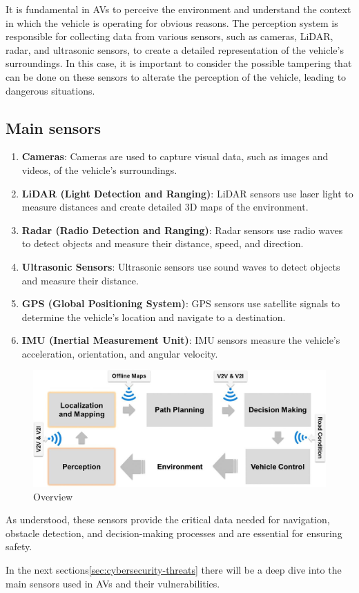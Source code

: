 It is fundamental in AVs to perceive the environment and understand the context in which the vehicle is operating for obvious reasons.
The perception system is responsible for collecting data from various sensors, such as cameras, LiDAR, radar, and ultrasonic sensors, to create a detailed representation of the vehicle's surroundings.
In this case, it is important to consider the possible tampering that can be done on these sensors to alterate the perception of the vehicle, leading to dangerous situations\cite{kim2020cybersecurity, sec-sensors-2023, metro2020analysis, sensors}.

\subsection{Main sensors}\label{subsec:main-sensors}

\begin{enumerate}
    \item \textbf{Cameras}: Cameras are used to capture visual data, such as images and videos, of the vehicle's surroundings.
    \item \textbf{LiDAR (Light Detection and Ranging)}: LiDAR sensors use laser light to measure distances and create detailed 3D maps of the environment.
    \item \textbf{Radar (Radio Detection and Ranging)}: Radar sensors use radio waves to detect objects and measure their distance, speed, and direction.
    \item \textbf{Ultrasonic Sensors}: Ultrasonic sensors use sound waves to detect objects and measure their distance.
    \item \textbf{GPS (Global Positioning System)}: GPS sensors use satellite signals to determine the vehicle's location and navigate to a destination.
    \item \textbf{IMU (Inertial Measurement Unit)}: IMU sensors measure the vehicle's acceleration, orientation, and angular velocity.
\end{enumerate}

\begin{figure}[!htb]
    \centering
    \includegraphics[width=0.7\linewidth]{figures/perception}
    \caption{Overview}
    \label{fig:sensors}
\end{figure}

As understood, these sensors provide the critical data needed for navigation, obstacle
detection, and decision-making processes and are essential for ensuring safety\cite{unknown2020connected,cybersec}.

In the next sections\ref{sec:cybersecurity-threats} there will be a deep dive into the main sensors used in AVs and their vulnerabilities.
